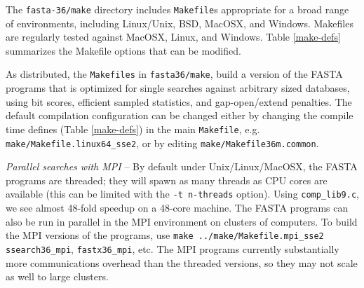 \documentclass[11pt]{article}
\begin{document}
The \texttt{fasta-36/make} directory includes \texttt{Makefile}s
appropriate for a broad range of environments, including Linux/Unix,
BSD, MacOSX, and Windows.  Makefiles are regularly tested against
MacOSX, Linux, and Windows. Table \ref{make-defs} summarizes the
Makefile options that can be modified.

As distributed, the \texttt{Makefiles} in \texttt{fasta36/make}, build
a version of the FASTA programs that is optimized for single searches
against arbitrary sized databases, using bit scores, efficient sampled
statistics, and gap-open/extend penalties.  The default compilation
configuration can be changed either by changing the compile time
defines (Table \ref{make-defs}) in the main \texttt{Makefile},
e.g. \texttt{make/Makefile.linux64\_sse2}, or by editing
\texttt{make/Makefile36m.common}.

\emph{Parallel searches with MPI} -- By default under
Unix/Linux/MacOSX, the FASTA programs are threaded; they will spawn as
many threads as CPU cores are available (this can be limited with the
\texttt{-t n-threads} option).  Using \texttt{comp\_lib9.c}, we see
almost 48-fold speedup on a 48-core machine.  The FASTA programs can
also be run in parallel in the MPI environment on clusters of
computers.  To build the MPI versions of the programs, use
\texttt{make ../make/Makefile.mpi\_sse2 ssearch36\_mpi},
\texttt{fastx36\_mpi}, etc.  The MPI programs currently substantially
more communications overhead than the threaded versions, so they may
not scale as well to large clusters.


\end{document}
